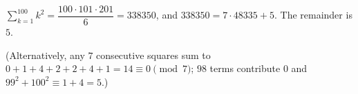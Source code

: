 $\displaystyle\sum_{k=1}^{100}k^2=\dfrac{100\cdot101\cdot201}6=338350$, and $338350=7\cdot48335+5$. The remainder is $\boxed{5}$.

(Alternatively, any $7$ consecutive squares sum to $0+1+4+2+2+4+1=14\equiv0\pmod7$; $98$ terms contribute $0$ and $99^2+100^2\equiv1+4=5$.)
